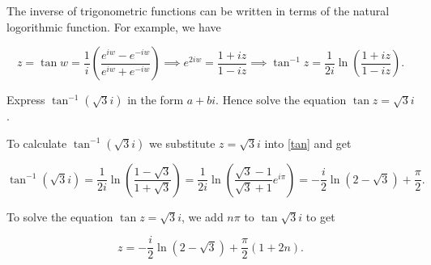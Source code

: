 \documentclass[english,a4paper,12pt]{report}
\begin{document}
The inverse of trigonometric functions can be written in terms of the natural logorithmic function. For example, we have

\begin{equation}
    z = \tan w = \frac{1}{i} \left( \frac{e^{iw} - e^{-iw} }{e^{iw} + e^{-iw}  }  \right) \implies e^{2iw} = \frac{1+iz}{1-iz}  \implies \tan ^{-1} z = \frac{1}{2i} \ln \left( \frac{1+iz}{1-iz}  \right). \label{tan} 
\end{equation}

{Express \(\tan ^{-1} {(\sqrt{3}i )} \) in the form \(a+bi\). Hence solve the equation \(\tan z = \sqrt{3} i\).}
{To calculate \(\tan ^{-1} {(\sqrt{3} i)}\) we substitute \(z = \sqrt{3}i \) into \cref{tan} and get

\begin{equation}
    \tan ^{-1} (\sqrt{3} i) = \frac{1}{2i} \ln (\frac{1-\sqrt{3} }{1+\sqrt{3} } ) = \frac{1}{2i} \ln \left( \frac{\sqrt{3}-1 }{\sqrt{3}+1 } e^{i\pi }  \right) = -\frac{i}{2} \ln (2-\sqrt{3} ) + \frac{\pi }{2}.    
\end{equation}

To solve the equation \(\tan z = \sqrt{3} i\), we add \(n\pi \) to \(\tan \sqrt{3}i \) to get 

\begin{equation}
    z = - \frac{i}{2} \ln (2-\sqrt{3} ) + \frac{\pi }{2} (1+ 2n).  
\end{equation}
 } 
\end{document}
